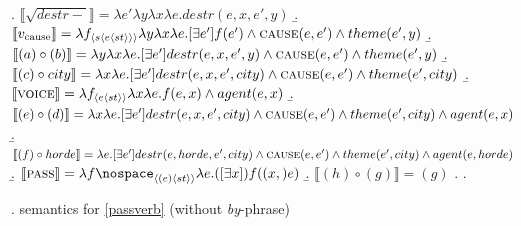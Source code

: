 \documentclass[12pt]{article}
\newcommand*{\textsub}[1]{\ensuremath{_\textrm{{\scriptsize #1}}}}
\begin{document}
\a. \begin{math}\llbracket\sqrt{destr-}\rrbracket = \lambda e' \lambda y \lambda x \lambda e . destr(e,x,e',y)\end{math}
\b. \begin{math}\llbracket v\textsub{cause}\rrbracket = \lambda f_{\langle s\langle e \langle st \rangle \rangle \rangle} \lambda y \lambda x \lambda e . [\exists e']f(e') \land \textsc{cause}(e,e') \land theme(e',y)\end{math}
\b. \begin{math}\llbracket (a) \circ (b) \rrbracket = \lambda y \lambda x \lambda e . [\exists e'] destr(e,x,e',y) \land \textsc{cause}(e,e') \land theme(e',y) \end{math}
\b. \begin{math}\llbracket (c) \circ city\rrbracket = \lambda x \lambda e . [\exists e'] destr(e,x,e',city) \land \textsc{cause}(e,e') \land theme(e',city) \end{math}
\b. \begin{math}\llbracket \textsc{voice}\rrbracket = \lambda f_{\langle e \langle st \rangle \rangle } \lambda x \lambda e . f(e,x) \land agent(e,x) \end{math}
\b. \begin{math}\llbracket (e) \circ (d) \rrbracket = \lambda x \lambda e . [\exists e'] destr(e,x,e',city) \land \textsc{cause}(e,e') \land theme(e',city) \land agent(e,x) \end{math}
\b. \begin{math}\llbracket (f) \circ horde \rrbracket = \lambda e . [\exists e'] destr(e,horde,e',city) \land \textsc{cause}(e,e') \land theme(e',city) \land agent(e,horde) \end{math}
\b. \begin{math}\llbracket \textsc{pass}\rrbracket =\lambda f\nospace_{\langle (e) \langle st \rangle\rangle}\lambda e . ([\exists x]) f((x,)e) \end{math}
\b. \begin{math}\llbracket (h) \circ (g) \rrbracket = (g) \end{math}
\z. \z. \par

\ex. \label{passverbsem2}semantics for \ref{passverb} (without \textit{by}-phrase)
\end{document}
